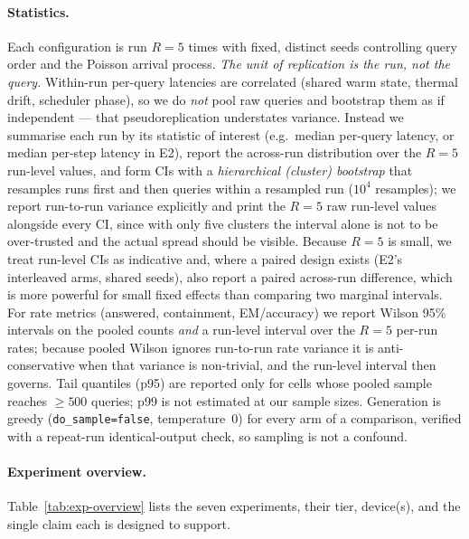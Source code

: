\paragraph{Statistics.} Each configuration is run $R{=}5$ times with
fixed, distinct seeds controlling query order and the Poisson arrival
process. \emph{The unit of replication is the run, not the query.} Within-run
per-query latencies are correlated (shared warm state, thermal drift,
scheduler phase), so we do \emph{not} pool raw queries and bootstrap them
as if independent --- that pseudoreplication understates variance. Instead
we summarise each run by its statistic of interest (e.g.\ median per-query
latency, or median per-step latency in E2), report the across-run
distribution over the $R{=}5$ run-level values, and form CIs with a
\emph{hierarchical (cluster) bootstrap} that resamples runs first and then
queries within a resampled run ($10^4$ resamples); we report run-to-run
variance explicitly and print the $R{=}5$ raw run-level values alongside
every CI, since with only five clusters the interval alone is not to be
over-trusted and the actual spread should be visible. Because $R{=}5$ is small, we treat run-level CIs as
indicative and, where a paired design exists (E2's interleaved arms,
shared seeds), also report a paired across-run difference, which is more
powerful for small fixed effects than comparing two marginal intervals.
For rate metrics (answered, containment, EM/accuracy) we report Wilson
95\% intervals on the pooled counts \emph{and} a run-level interval over
the $R{=}5$ per-run rates; because pooled Wilson ignores run-to-run rate
variance it is anti-conservative when that variance is non-trivial, and
the run-level interval then governs. Tail quantiles (p95) are reported
only for cells whose pooled sample reaches $\geq\num{500}$ queries; p99 is
not estimated at our sample sizes. Generation is greedy (\texttt{do\_sample=false},
temperature~0) for every arm of a comparison, verified with a repeat-run
identical-output check, so sampling is not a confound.

\paragraph{Experiment overview.} Table~\ref{tab:exp-overview} lists the
seven experiments, their tier, device(s), and the single claim each is
designed to support.

